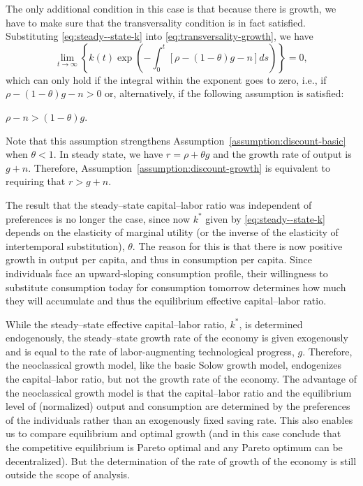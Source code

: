 \documentclass[\topdir/lecture\_notes.tex]{subfiles}
\begin{document}
The only additional condition in this case is that because there is growth, we have to make sure that the transversality condition is in fact satisfied. Substituting \eqref{eq:steady--state-k} into \eqref{eq:transversality-growth}, we have
\[
  \lim _{t \rightarrow \infty}\left\{k(t) \exp \left(-\int_{0}^{t}[\rho-(1-\theta) g-n] d s\right)\right\}=0,
\]
which can only hold if the integral within the exponent goes to zero, i.e., if $\rho-(1-\theta) g-n>0$ or, alternatively, if the following assumption is satisfied:
\begin{assumption}
  \label{assumption:discount-growth}
  $\rho-n>(1-\theta) g$.
\end{assumption}
Note that this assumption strengthens Assumption~\ref{assumption:discount-basic} when $\theta<1$. In steady state, we have $r=\rho+\theta g$ and the growth rate of output is $g+n$. Therefore, Assumption~\ref{assumption:discount-growth} is equivalent to requiring that $r>g+n$.

The result that the steady--state capital--labor ratio was independent of preferences is no longer the case, since now $k^{*}$ given by \eqref{eq:steady--state-k} depends on the elasticity of marginal utility (or the inverse of the elasticity of intertemporal substitution), $\theta$. The reason for this is that there is now positive growth in output per capita, and thus in consumption per capita. Since individuals face an upward-sloping consumption profile, their willingness to substitute consumption today for consumption tomorrow determines how much they will accumulate and thus the equilibrium effective capital--labor ratio.

While the steady--state effective capital--labor ratio, $k^{*}$, is determined endogenously, the steady--state growth rate of the economy is given exogenously and is equal to the rate of labor-augmenting technological progress, $g$. Therefore, the neoclassical growth model, like the basic Solow growth model, endogenizes the capital--labor ratio, but not the growth rate of the economy. The advantage of the neoclassical growth model is that the capital--labor ratio and the equilibrium level of (normalized) output and consumption are determined by the preferences of the individuals rather than an exogenously fixed saving rate. This also enables us to compare equilibrium and optimal growth (and in this case conclude that the competitive equilibrium is Pareto optimal and any Pareto optimum can be decentralized). But the determination of the rate of growth of the economy is still outside the scope of analysis.
\end{document}
